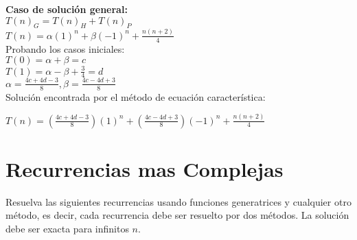 \documentclass{article}
\begin{document}
\begin{enumerate}[label=\textbf{\alph*.}]
  \textbf{Caso de solución general:}\\
  $T(n)_G = T(n)_H+T(n)_P$\\
  $T(n) = \alpha (1)^n + \beta (-1)^n + \frac{n(n+2)}{4}$\\
  Probando los casos iniciales:\\
  $T(0) = \alpha + \beta = c$\\
  $T(1) = \alpha - \beta + \frac{3}{4} = d$\\
  $\alpha = \frac{4c + 4d - 3}{8}, \beta = \frac{4c - 4d + 3}{8}$\\
  
  Soluci\'on encontrada por el m\'etodo de ecuaci\'on caracter\'istica:
  \begin{center}
  	$T(n) = (\frac{4c + 4d - 3}{8})(1)^n + (\frac{4c - 4d + 3}{8})(-1)^n + \frac{n(n+2)}{4}$
  \end{center}
  
\end{enumerate}

\section{Recurrencias mas Complejas}
Resuelva las siguientes recurrencias usando funciones generatrices y cualquier otro método, es decir, cada recurrencia debe ser resuelto por dos métodos. 
La solución debe ser exacta para infinitos $n$.
\end{document}
